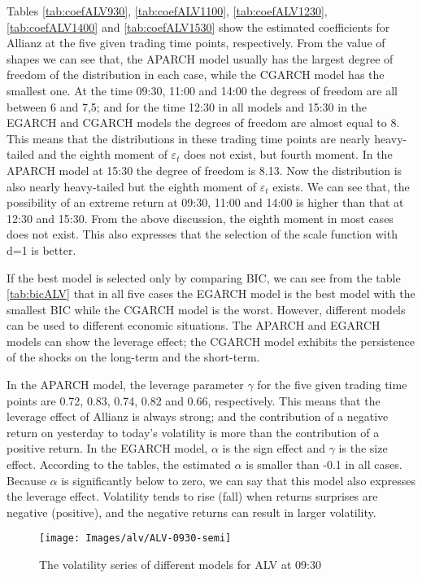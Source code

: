 Tables \ref{tab:coefALV930}, \ref{tab:coefALV1100}, \ref{tab:coefALV1230}, \ref{tab:coefALV1400} and \ref{tab:coefALV1530} show the estimated coefficients for Allianz at the five given trading time points, respectively. From the value of shapes we can see that, the APARCH model usually has the largest degree of freedom of the distribution in each case, while the CGARCH model has the smallest one. At the time 09:30, 11:00 and 14:00 the degrees of freedom are all between 6 and 7,5; and for the time 12:30 in all models and 15:30 in the EGARCH and CGARCH models the degrees of freedom are almost equal to 8. This means that the distributions in these trading time points are nearly heavy-tailed and the eighth moment of $\varepsilon_t$ does not exist, but fourth moment. In the APARCH model at 15:30 the degree of freedom is 8.13. Now the distribution is also nearly heavy-tailed but the eighth moment of $\varepsilon_t$ exists. We can see that, the possibility of an extreme return at 09:30, 11:00 and 14:00 is higher than that at 12:30 and 15:30. From the above discussion, the eighth moment in most cases does not exist. This also expresses that the selection of the scale function with d=1 is better.

If the best model is selected only by comparing BIC, we can see from the table \ref{tab:bicALV} that in all five cases the EGARCH model is the best model with the smallest BIC while the CGARCH model is the worst. However, different models can be used to different economic situations. The APARCH and EGARCH models can show the leverage effect; the CGARCH model exhibits the persistence of the shocks on the long-term and the short-term.

In the APARCH model, the leverage parameter $\gamma$ for the five given trading time points are 0.72, 0.83, 0.74, 0.82 and 0.66, respectively. This means that the leverage effect of Allianz is always strong; and the contribution of a negative return on yesterday to today's volatility is more than the contribution of a positive return. In the EGARCH model, $\alpha$ is the sign effect and $\gamma$ is the size effect. According to the tables, the estimated $\alpha$ is smaller than -0.1 in all cases. Because $\alpha$ is significantly below to zero, we can say that this model also expresses the leverage effect. Volatility tends to rise (fall) when returns surprises are negative (positive), and the negative returns can result in larger volatility.

\begin{figure}[!htbp]
	\centering
	\texttt{[image: Images/alv/ALV-0930-semi]}
	\caption[The volatility series of different models for ALV at 09:30]{The volatility series of different models for ALV at 09:30}
	\label{fig:ALVsemi0930}
\end{figure}

